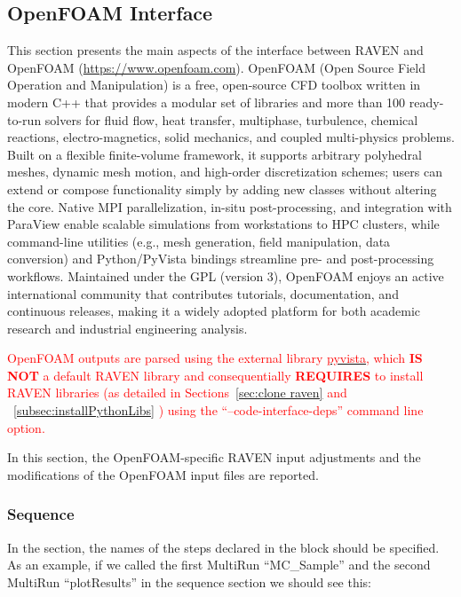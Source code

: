 \subsection{OpenFOAM Interface}
This section presents the main aspects of the interface between RAVEN and OpenFOAM (\url{https://www.openfoam.com}).
OpenFOAM (Open Source Field Operation and Manipulation) is a free, open-source CFD toolbox written in modern C++ 
that provides a modular set of libraries and more than 100 ready-to-run solvers for fluid flow, heat transfer, multiphase, 
turbulence, chemical reactions, electro-magnetics, solid mechanics, and coupled multi-physics problems. Built on a flexible 
finite-volume framework, it supports arbitrary polyhedral meshes, dynamic mesh motion, and high-order discretization schemes; 
users can extend or compose functionality simply by adding new classes without altering the core. Native MPI parallelization, 
in-situ post-processing, and integration with ParaView enable scalable simulations from workstations to HPC clusters, while 
command-line utilities (e.g., mesh generation, field manipulation, data conversion) and Python/PyVista bindings streamline 
pre- and post-processing workflows. Maintained under the GPL (version 3), OpenFOAM enjoys an active international community that 
contributes tutorials, documentation, and continuous releases, making it a widely adopted platform for both academic 
research and industrial engineering analysis.

\nb \textcolor{red}{OpenFOAM outputs are parsed using the external library \href{https://pyvista.org}{ \textcolor{red}{pyvista}}, 
                             which \textbf{IS NOT} a default RAVEN library and consequentially \textbf{REQUIRES} to install RAVEN libraries
                             (as detailed in Sections~\ref{sec:clone raven} and ~\ref{subsec:installPythonLibs} )
                             using the ``--code-interface-deps'' command line option.} 

In this section, the OpenFOAM-specific RAVEN input adjustments and the modifications of the OpenFOAM
input files are reported. \noindent
\subsubsection{Sequence}
In the  section, the names of the steps declared in the
 block should be specified.
%
As an example, if we called the first MultiRun ``MC\_Sample'' and the second
MultiRun ``plotResults'' in the sequence section we should see this:


